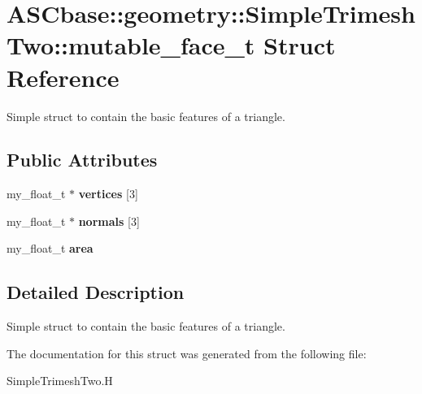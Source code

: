 \section{ASCbase::geometry::Simple\-Trimesh\-Two::mutable\_\-face\_\-t Struct Reference}
\label{structASCbase_1_1geometry_1_1SimpleTrimeshTwo_1_1mutable__face__t}
Simple struct to contain the basic features of a triangle.  


\subsection*{Public Attributes}
\begin{CompactItemize}
\item 
my\_\-float\_\-t $\ast$ \textbf{vertices} [3]\label{structASCbase_1_1geometry_1_1SimpleTrimeshTwo_1_1mutable__face__t_4ce4319c87a9201b217b9a970a83b71f}

\item 
my\_\-float\_\-t $\ast$ \textbf{normals} [3]\label{structASCbase_1_1geometry_1_1SimpleTrimeshTwo_1_1mutable__face__t_55a28c9e943397967c87fbd1ed77044e}

\item 
my\_\-float\_\-t \textbf{area}\label{structASCbase_1_1geometry_1_1SimpleTrimeshTwo_1_1mutable__face__t_28bec723ad7fbb05538d45cf3f46c177}

\end{CompactItemize}


\subsection{Detailed Description}
Simple struct to contain the basic features of a triangle. 



The documentation for this struct was generated from the following file:\begin{CompactItemize}
\item 
Simple\-Trimesh\-Two.H\end{CompactItemize}
